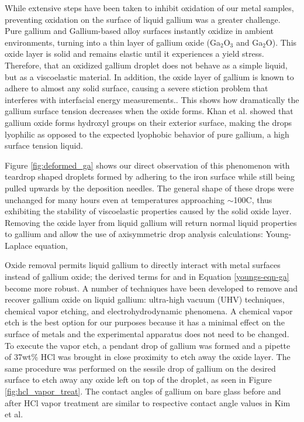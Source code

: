 While extensive steps have been taken to inhibit oxidation of our metal samples, preventing oxidation on the surface of liquid gallium was a greater challenge. Pure gallium and Gallium-based alloy surfaces instantly oxidize in ambient environments, turning into a thin layer of gallium oxide (Ga$_{2}$O$_{3}$ and Ga$_{2}$O).\cite{Regan1995,Regan1997,Scharmann2004} This oxide layer is solid and remains elastic until it experiences a yield stress. Therefore, that an oxidized gallium droplet does not behave as a simple liquid, but as a viscoelastic material. In addition, the oxide layer of gallium is known to adhere to almost any solid surface, causing a severe stiction problem that interferes with interfacial energy measurements.\cite{Scharmann2004}. This shows how dramatically the gallium surface tension decreases when the oxide forms. Khan et al. showed that gallium oxide forms hydroxyl groups on their exterior surface, making the drops lyophilic as opposed to the expected lyophobic behavior of pure gallium, a high surface tension liquid.\cite{Hardy1985,Alchagirov2005} 


Figure \ref{fig:deformed_ga} shows our direct observation of this phenomenon with teardrop shaped droplets formed by adhering to the iron surface while still being pulled upwards by the deposition needles. The general shape of these drops were unchanged for many hours even at temperatures approaching $\sim$100\degree C, thus exhibiting the stability of viscoelastic properties caused by the solid oxide layer. Removing the oxide layer from liquid gallium will return normal liquid properties to gallium and allow the use of axisymmetric drop analysis calculations: Young-Laplace equation, 



Oxide removal permits liquid gallium to directly interact with metal surfaces instead of gallium oxide; the derived terms for \gamSL and \gamLV in Equation \ref{youngs-eqn-ga} become more robust. A number of techniques have been developed to remove and recover gallium oxide on liquid gallium: ultra-high vacuum (UHV) techniques,\cite{Regan1995,Regan1997} chemical vapor etching,\cite{Kim2013,Doudrick2014} and electrohydrodynamic phenomena.\cite{Khan2014} A chemical vapor etch is the best option for our purposes because it has a minimal effect on the surface of metals and the experimental apparatus does not need to be changed. To execute the vapor etch, a pendant drop of gallium was formed and a pipette of 37wt\% HCl was brought in close proximity to etch away the oxide layer. The same procedure was performed on the sessile drop of gallium on the desired surface to etch away any oxide left on top of the droplet, as seen in Figure \ref{fig:hcl_vapor_treat}. The contact angles of gallium on bare glass before and after HCl vapor treatment are similar to respective contact angle values in Kim et al.\cite{Kim2013}

